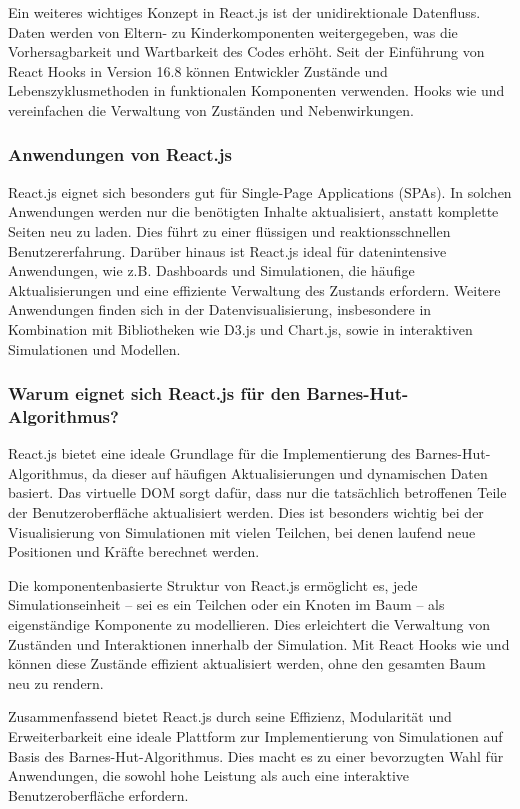 \documentclass[a4paper,12pt,twoside]{article}
\begin{document}
Ein weiteres wichtiges Konzept in React.js ist der unidirektionale Datenfluss. 
Daten werden von Eltern- zu Kinderkomponenten weitergegeben, was die Vorhersagbarkeit 
und Wartbarkeit des Codes erhöht. Seit der Einführung von React Hooks in Version 16.8 
können Entwickler Zustände und Lebenszyklusmethoden in funktionalen Komponenten verwenden. 
Hooks wie  und  vereinfachen 
die Verwaltung von Zuständen und Nebenwirkungen.

\subsubsection{Anwendungen von React.js}
React.js eignet sich besonders gut für Single-Page Applications (SPAs). 
In solchen Anwendungen werden nur die benötigten Inhalte aktualisiert, 
anstatt komplette Seiten neu zu laden. Dies führt zu einer flüssigen und 
reaktionsschnellen Benutzererfahrung. Darüber hinaus ist React.js ideal für 
datenintensive Anwendungen, wie z.B. Dashboards und Simulationen, die häufige 
Aktualisierungen und eine effiziente Verwaltung des Zustands erfordern. Weitere 
Anwendungen finden sich in der Datenvisualisierung, insbesondere in Kombination 
mit Bibliotheken wie D3.js und Chart.js, sowie in interaktiven Simulationen und Modellen.

\subsubsection{Warum eignet sich React.js für den Barnes-Hut-Algorithmus?}
React.js bietet eine ideale Grundlage für die Implementierung des Barnes-Hut-Algorithmus, 
da dieser auf häufigen Aktualisierungen und dynamischen Daten basiert. Das virtuelle DOM 
sorgt dafür, dass nur die tatsächlich betroffenen Teile der Benutzeroberfläche aktualisiert 
werden. Dies ist besonders wichtig bei der Visualisierung von Simulationen mit vielen 
Teilchen, bei denen laufend neue Positionen und Kräfte berechnet werden.

Die komponentenbasierte Struktur von React.js ermöglicht es, jede Simulationseinheit -- 
sei es ein Teilchen oder ein Knoten im Baum -- als eigenständige Komponente 
zu modellieren. Dies erleichtert die Verwaltung von Zuständen und Interaktionen 
innerhalb der Simulation. Mit React Hooks wie  
und  können diese Zustände effizient aktualisiert werden, 
ohne den gesamten Baum neu zu rendern.

Zusammenfassend bietet React.js durch seine Effizienz, Modularität und Erweiterbarkeit 
eine ideale Plattform zur Implementierung von Simulationen auf Basis des 
Barnes-Hut-Algorithmus. Dies macht es zu einer bevorzugten Wahl für Anwendungen, 
die sowohl hohe Leistung als auch eine interaktive Benutzeroberfläche erfordern.
\end{document}
